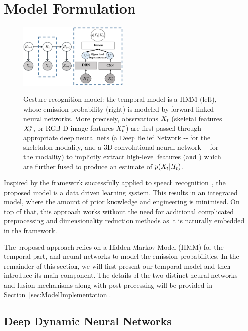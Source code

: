 

\section{Model Formulation}
\label{sec:approach}

\begin{figure}[t]
  \centering
  \includegraphics[width=0.48\textwidth]{images/GraphicalModel_new2}\\
  \caption{Gesture recognition model: the temporal model is a HMM (left), whose emission probability
\emissionprob{} (right) is modeled by forward-linked neural networks.
More precisely, observations $X_t$ (skeletal features $X^{s}_t$, or RGB-D image features $X^{r}_t$)
are first passed through appropriate deep neural nets (a Deep Belief Network -\DBN- for the skeletalon modality, and
 a 3D convolutional neural network -\ThreeDCNN- for the \RGBD  modality) to implictly extract high-level features (\highSK and \highRGBD)
which are further fused to produce an estimate of $p(X_t|H_t)$.
}
\label{fig:GM}
\end{figure}

Inspired by the framework successfully applied to speech recognition~\cite{mohamed2012acoustic}, the proposed model is a data driven learning system. This results in an integrated model, where the amount of prior knowledge and engineering is minimised. On top of that, this approach works without the need for additional complicated preprocessing and dimensionality reduction methods as it is naturally embedded in the framework.

The proposed approach relies on a Hidden Markov Model (HMM) for the temporal part,
and neural networks to model the emission probabilities.
 In the remainder of this section, we will first present our temporal model and then introduce its main component.
The details of the two distinct neural networks and fusion mechanisms along with post-processing will be provided
in Section~\ref{sec:ModelImplementation}.


\subsection{Deep Dynamic Neural Networks}
\label{sec:DDNN}

